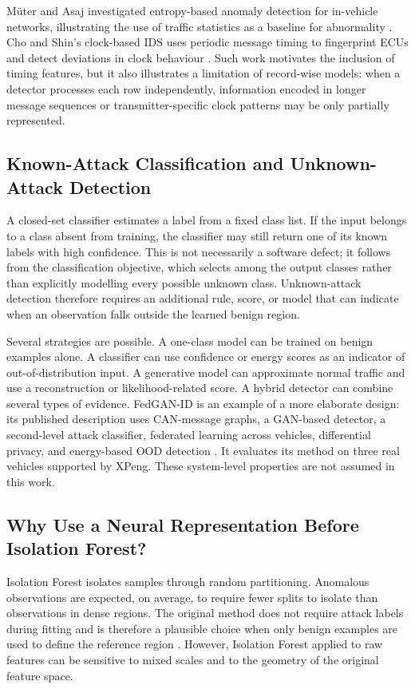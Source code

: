 \documentclass[journal]{IEEEtran}
\begin{document}
M\"uter and Asaj investigated entropy-based anomaly detection for in-vehicle networks, illustrating the use of traffic statistics as a baseline for abnormality \cite{muter2011entropy}. Cho and Shin's clock-based IDS uses periodic message timing to fingerprint ECUs and detect deviations in clock behaviour \cite{cho2016fingerprinting}. Such work motivates the inclusion of timing features, but it also illustrates a limitation of record-wise models: when a detector processes each row independently, information encoded in longer message sequences or transmitter-specific clock patterns may be only partially represented.

\subsection{Known-Attack Classification and Unknown-Attack Detection}
A closed-set classifier estimates a label from a fixed class list. If the input belongs to a class absent from training, the classifier may still return one of its known labels with high confidence. This is not necessarily a software defect; it follows from the classification objective, which selects among the output classes rather than explicitly modelling every possible unknown class. Unknown-attack detection therefore requires an additional rule, score, or model that can indicate when an observation falls outside the learned benign region.

Several strategies are possible. A one-class model can be trained on benign examples alone. A classifier can use confidence or energy scores as an indicator of out-of-distribution input. A generative model can approximate normal traffic and use a reconstruction or likelihood-related score. A hybrid detector can combine several types of evidence. FedGAN-ID is an example of a more elaborate design: its published description uses CAN-message graphs, a GAN-based detector, a second-level attack classifier, federated learning across vehicles, differential privacy, and energy-based OOD detection \cite{chen2025fedgan}. It evaluates its method on three real vehicles supported by XPeng. These system-level properties are not assumed in this work.

\subsection{Why Use a Neural Representation Before Isolation Forest?}
Isolation Forest isolates samples through random partitioning. Anomalous observations are expected, on average, to require fewer splits to isolate than observations in dense regions. The original method does not require attack labels during fitting and is therefore a plausible choice when only benign examples are used to define the reference region \cite{liu2008isolation}. However, Isolation Forest applied to raw features can be sensitive to mixed scales and to the geometry of the original feature space.
\end{document}
